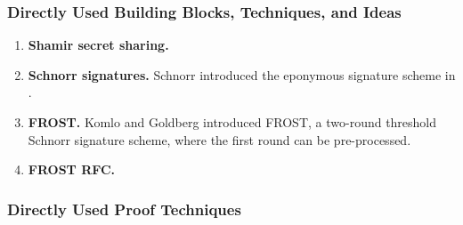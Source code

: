 \subsubsection{Directly Used Building Blocks, Techniques, and Ideas}

\begin{enumerate}
\item \textbf{Shamir secret sharing.}
\item \textbf{Schnorr signatures.} Schnorr introduced the eponymous signature scheme in \cite{Schnorr91}. 
\item \textbf{FROST.} Komlo and Goldberg introduced FROST, a two-round threshold Schnorr signature scheme, where the first round can be pre-processed. 
\item \textbf{FROST RFC.}
\end{enumerate}

\subsubsection{Directly Used Proof Techniques}

